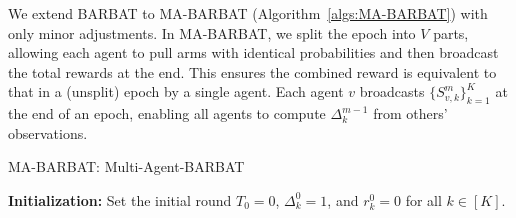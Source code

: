 We extend BARBAT to MA-BARBAT (Algorithm~\ref{algs:MA-BARBAT}) with only minor adjustments. %
In MA-BARBAT, we split the epoch into $V$ parts, allowing each agent to pull arms with identical probabilities and then broadcast the total rewards at the end. This ensures the combined reward is equivalent to that in a (unsplit) epoch by a single agent. Each agent $v$ broadcasts $\{S_{v,k}^m\}_{k=1}^K$ at the end of an epoch, enabling all agents to compute $\Delta_k^{m-1}$ from others' observations.
\begin{algorithm}[t]
    \LinesNumbered
    \SetAlgoLined
    \caption{MA-BARBAT: Multi-Agent-BARBAT}
    \label{algs:MA-BARBAT}

    
    \textbf{Initialization:} 
    Set the initial round \( T_0 = 0 \), \( \Delta_k^0 = 1 \), and \( r_k^0 = 0 \) for all \( k \in [K] \).

\end{algorithm}
